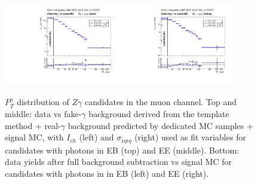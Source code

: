 \begin{figure}[htb]
\begin{center}
\includegraphics[width=0.45\textwidth]{../figs/figs_v11/MUON_ZGamma/PrepareYields/c_BkgSubtrDATAvsSIGMC_c_MUON_ZGamma__UNblind__Barrel__phoEt.pdf}\includegraphics[width=0.45\textwidth]{../figs/figs_v11/MUON_ZGamma/PrepareYields/c_BkgSubtrDATAvsSIGMC_c_MUON_ZGamma__UNblind__Endcap__phoEt.pdf}\\
  \caption{$P_T^{\gamma}$ distribution of $Z\gamma$ candidates in the muon channel. Top and middle: data vs fake-$\gamma$ background derived from the template method + real-$\gamma$ background predicted by dedicated MC samples + signal MC, with $I_{ch}$ (left) and $\sigma_{i\eta i\eta}$ (right) used as fit variables for candidates with photons in EB (top) and EE (middle). Bottom: data yields after full background subtraction vs signal MC for candidates with photons in in EB (left) and EE (right).}
  \label{fig:DDvsMC_Zg_Data_MUON}
  \end{center}
\end{figure}

